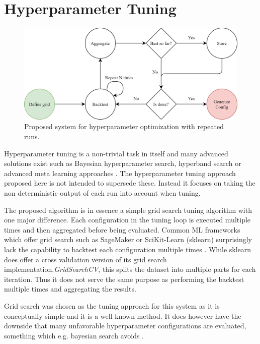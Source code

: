 \section{Hyperparameter Tuning}
\label{sec:hpo}
\begin{figure}[h]
  \centering
  \includegraphics[width=\linewidth]{./img/tuning_overview.png}
  \caption{Proposed system for hyperparameter optimization with repeated runs.}
  \label{fig:proposed_hyperparameter_tuning}
\end{figure}
Hyperparameter tuning is a non-trivial task in itself and many advanced solutions exist such as Bayesian hyperparameter search, hyperband search or advanced meta learning approaches \cite{snoek2012practical,feurer2019hyperparameter, li2017hyperband}. The hyperparameter tuning approach proposed here is not intended to supersede these. Instead it focuses on taking the non deterministic output of each run into account when tuning.

The proposed algorithm is in essence a simple grid search tuning algorithm with one major difference. Each configuration in the tuning loop is executed multiple times and then aggregated before being evaluated. Common ML frameworks which offer grid search such as SageMaker or SciKit-Learn (sklearn) surprisingly lack the capability to backtest each configuration multiple times \cite{sagemaker_website, scikit-learn}. While sklearn does offer a cross validation version of its grid search implementation,\textit{GridSearchCV}, this splits the dataset into multiple parts for each iteration. Thus it does not serve the same purpose as performing the backtest multiple times and aggregating the results.

Grid search was chosen as the tuning approach for this system as it is conceptually simple and it is a well known method. It does however have the downside that many unfavorable hyperparameter configurations are evaluated, something which e.g. bayesian search avoids \cite{snoek2012practical}.

